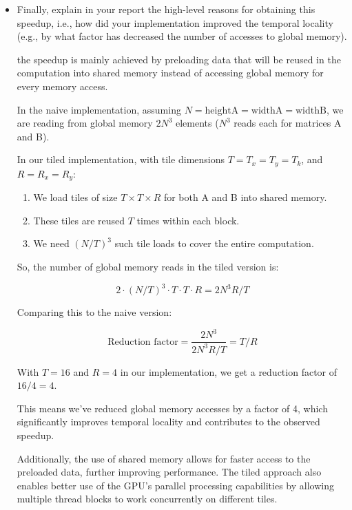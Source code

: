 \documentclass{article}
\begin{document}
\begin{itemize}
    \item Finally, explain in your report the high-level reasons for obtaining
    this speedup, i.e., how did your implementation improved the temporal
    locality (e.g., by what factor has decreased the number of accesses to
    global memory).

    the speedup is mainly achieved by preloading data that will be reused in the computation into shared memory instead of accessing global memory for every memory access.
    

    In the naive implementation, assuming $N = \text{heightA} = \text{widthA} = \text{widthB}$, we are reading from global memory $2N^3$ elements ($N^3$ reads each for matrices A and B).

    In our tiled implementation, with tile dimensions $T = T_x = T_y = T_k$, and $R = R_x = R_y$:
    
    \begin{enumerate}
        \item We load tiles of size $T \times T \times R$ for both A and B into shared memory.
        \item These tiles are reused $T$ times within each block.
        \item We need $(N/T)^3$ such tile loads to cover the entire computation.
    \end{enumerate}
    
    So, the number of global memory reads in the tiled version is:
    
    \[ 2 \cdot (N/T)^3 \cdot T \cdot T \cdot R = 2N^3R/T \]
    
    Comparing this to the naive version:
    
    \[ \text{Reduction factor} = \frac{2N^3}{2N^3R/T} = T/R \]
    
    With $T = 16$ and $R = 4$ in our implementation, we get a reduction factor of $16/4 = 4$.
    
    This means we've reduced global memory accesses by a factor of 4, which significantly improves temporal locality and contributes to the observed speedup.
    
    Additionally, the use of shared memory allows for faster access to the preloaded data, further improving performance. The tiled approach also enables better use of the GPU's parallel processing capabilities by allowing multiple thread blocks to work concurrently on different tiles.    

\end{itemize}
\end{document}
